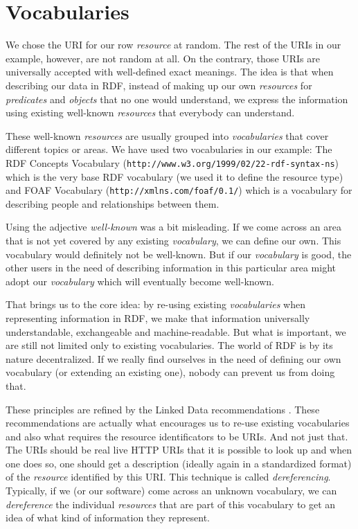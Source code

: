 \section{Vocabularies}

We chose the URI for our row \emph{resource} at random. The rest of the URIs in our example, however, are not random at all. On the contrary, those URIs are universally accepted with well-defined exact meanings. The idea is that when describing our data in RDF, instead of making up our own \emph{resources} for \emph{predicates} and \emph{objects} that no one would understand, we express the information using existing well-known \emph{resources} that everybody can understand.

These well-known \emph{resources} are usually grouped into \emph{vocabularies} that cover different topics or areas. We have used two vocabularies in our example: The RDF Concepts Vocabulary (\texttt{http://www.w3.org/1999/02/22-rdf-syntax-ns}) \cite{rdf_vocab} which is the very base RDF vocabulary (we used it to define the resource type) and FOAF Vocabulary (\texttt{http://xmlns.com/foaf/0.1/}) \cite{foaf_vocab} which is a vocabulary for describing people and relationships between them.

Using the adjective \emph{well-known} was a bit misleading. If we come across an area that is not yet covered by any existing \emph{vocabulary}, we can define our own. This vocabulary would definitely not be well-known. But if our \emph{vocabulary} is good, the other users in the need of describing information in this particular area might adopt our \emph{vocabulary} which will eventually become well-known.

That brings us to the core idea: by re-using existing \emph{vocabularies} when representing information in RDF, we make that information universally understandable, exchangeable and machine-readable. But what is important, we are still not limited only to existing vocabularies. The world of RDF is by its nature decentralized. If we really find ourselves in the need of defining our own vocabulary (or extending an existing one), nobody can prevent us from doing that.

These principles are refined by the Linked Data recommendations \cite{ld}. These recommendations are actually what encourages us to re-use existing vocabularies and also what requires the resource identificators to be URIs. And not just that. The URIs should be real live HTTP URIs that it is possible to look up and when one does so, one should get a description (ideally again in a standardized format) of the \emph{resource} identified by this URI. This technique is called \emph{dereferencing}. Typically, if we (or our software) come across an unknown vocabulary, we can \emph{dereference} the individual \emph{resources} that are part of this vocabulary to get an idea of what kind of information they represent. 

